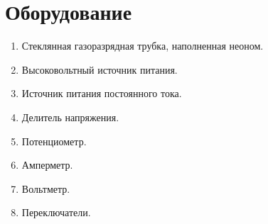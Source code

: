 \section*{Оборудование}

\begin{enumerate}
	\item Стеклянная газоразрядная трубка, наполненная неоном.
	
	\item Высоковольтный источник питания.
	
	\item Источник питания постоянного тока.
	
	\item Делитель напряжения.
	
	\item Потенциометр.
	
	\item Амперметр.
	
	\item Вольтметр.
	
	\item Переключатели.
\end{enumerate}